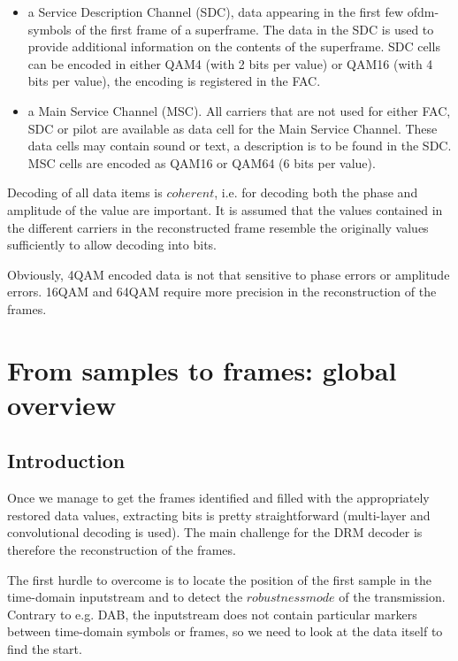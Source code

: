 \documentclass[11pt]{article}
\begin{document}
\begin{itemize}
\begin{itemize}
{4 bits determined by phase and amplitude. For 64QAM
each quadrant houses 16 possible positions, and the value can encode 6 bits
determined by phase and amplitude.}
so basically as long as the phase is
more or less correct, correct data can be extracted.
\item a Service Description Channel (SDC), data appearing in the first
few ofdm-symbols of the first frame of a superframe. The data in the SDC
is used to provide additional information on the contents of the superframe.
SDC cells can be encoded in either QAM4 (with 2 bits per value) or
QAM16 (with 4 bits per value),
the encoding is registered in the FAC.
\item a Main Service Channel (MSC). All carriers that are not used
for either FAC,
SDC or pilot are available as data cell for the Main Service Channel.
These data cells may contain sound or text, a description is to be found in the SDC.
MSC cells are encoded as QAM16 or QAM64 (6 bits per value).
\end{itemize}
\end{itemize}

Decoding  of all data items is $coherent$, i.e. for decoding both the phase
and amplitude of the value are important.
It is assumed that
the values contained in the different carriers in the
reconstructed frame resemble the originally values sufficiently
to allow decoding into bits.

Obviously, 4QAM encoded data is not that
sensitive to phase errors or amplitude errors.
16QAM and 64QAM require more precision in the reconstruction of the frames.
\section{From samples to frames: global overview}
\subsection{Introduction}
Once we manage to get the frames identified and filled
with the appropriately restored data values,
extracting bits is pretty straightforward (multi-layer and convolutional
decoding is used).
The main challenge for the DRM decoder is therefore the reconstruction
of the frames.

The first hurdle to overcome is to locate the position of the first
sample in the time-domain inputstream and to detect the 
$robustnessmode$ of the transmission.
Contrary to e.g. DAB, the inputstream does not contain
particular markers between time-domain symbols or frames,
so we need to look at the data itself
to find the start.
\end{document}
